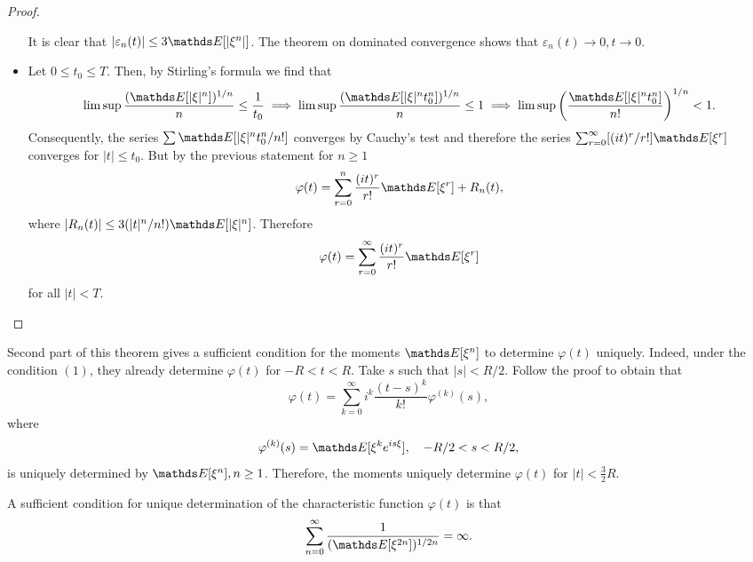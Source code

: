 \begin{proof}
\begin{itemize}
\begin{equation*}
\end{equation*}
It is clear that $|\varepsilon_n(t)| \le 3 \E[|\xi^n|]$. The theorem on dominated convergence shows that $\varepsilon_n(t) \to 0, t \to 0$.
    \item Let $0 \le t_0 \le T$. Then, by Stirling's formula we find that
    \begin{equation*}
        \limsup \frac{(\E[|\xi|^n])^{1/n}}{n} \le \frac{1}{t_0} \implies \limsup \frac{(\E[|\xi|^n t_0^n])^{1/n}}{n} \le 1 \implies \limsup \bigg(\frac{\E[|\xi|^nt_0^n]}{n!} \bigg)^{1/n} < 1.
    \end{equation*}
    Consequently, the series $\sum \E[|\xi|^n t_0^n/n!]$ converges by Cauchy's test and therefore the series $\sum_{r=0}^\infty [(it)^r/r!]\E[\xi^r]$ converges for $|t| \le t_0$. But by the previous statement for $n \ge 1$
    \begin{equation*}
        \varphi(t) = \sum_{r=0}^n \frac{(it)^r}{r!} \E[\xi^r] + R_n(t),
    \end{equation*}
    where $|R_n(t)| \le 3(|t|^n/n!)\E[|\xi|^n]$. Therefore 
    \begin{equation*}
        \varphi(t) = \sum_{r=0}^\infty \frac{(it)^r}{r!}\E[\xi^r]
    \end{equation*}
    for all $|t| < T$.
\end{itemize}
\end{proof}
\begin{remark}
Second part of this theorem gives a sufficient condition for the moments $\E[\xi^n]$ to determine $\varphi(t)$ uniquely. Indeed, under the condition $(1)$, they already determine $\varphi(t)$ for $-R < t < R$. Take $s$ such that $|s| < R/2$. Follow the proof to obtain that 
\begin{equation*}
    \varphi(t) = \sum_{k=0}^\infty i^k \frac{(t-s)^k}{k!}\varphi^{(k)}(s),
\end{equation*}
where 
\begin{equation*}
    \varphi^{(k)}(s) = \E[\xi^k e^{is\xi}], \quad -R/2 < s < R/2,
\end{equation*}
is uniquely determined by $\E[\xi^n], n \ge 1$. Therefore, the moments uniquely determine $\varphi(t)$ for $|t| < \frac32 R$.
\end{remark}

\begin{theorem}
A sufficient condition for unique determination of the characteristic function $\varphi(t)$ is that
\begin{equation*}
    \sum_{n=0}^\infty \frac{1}{(\E[\xi^{2n}])^{1/2n}} = \infty.
\end{equation*}
\end{theorem}

